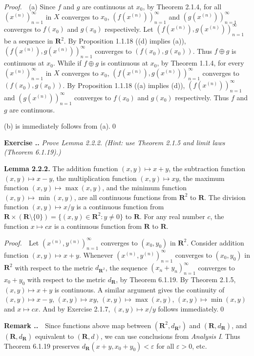 \documentclass{book}
\newcommand{\pff}{\vspace{.25em}\noindent\emph{Proof.}~~}
\newcommand{\remark}{\vspace{.5em}\noindent\textbf{Remark \textbf{\theExercise}}~~}
\newcommand{\titl}[1]{\noindent\textbf{#1}}
\newcounter{Exercise}[section]
\renewcommand{\theExercise}{\thesection.\arabic{Exercise}.}
\newcommand{\new}{\vspace{1.5em}\noindent\textbf{Exercise \stepcounter{Exercise}\textbf{\theExercise}} }
\begin{document}
\pff (a) Since $f$ and $g$ are continuous at $x_0$, by Theorem 2.1.4, for all $(x^{(n)})_{n=1}^{\infty}$ in $X$ converges to $x_0$, $(f(x^{(n)}))_{n=1}^{\infty}$ and $(g(x^{(n)}))_{n=1}^{\infty}$ converges to $f(x_0)$ and $g(x_0)$ respectively. Let $(f(x^{(n)}),g(x^{(n)}))_{n=1}^{\infty}$ be a sequence in $\mathbf{R}^2$. By Proposition 1.1.18 ((d) implies (a)), $(f(x^{(n)}),g(x^{(n)}))_{n=1}^{\infty}$ converges to $(f(x_0),g(x_0))$. Thus $f\oplus g$ is continuous at $x_0$. While if $f\oplus g$ is continuous at $x_0$, by Theorem 1.1.4, for every $(x^{(n)})_{n=1}^{\infty}$ in $X$ converges to $x_0$, $(f(x^{(n)}),g(x^{(n)}))_{n=1}^{\infty}$ converges to $(f(x_0),g(x_0))$. By Proposition 1.1.18 ((a) implies (d)), $(f(x^{(n)}))_{n=1}^{\infty}$ and $(g(x^{(n)}))_{n=1}^{\infty}$ converges to $f(x_0)$ and $g(x_0)$ respectively. Thus $f$ and $g$ are continuous.

(b) is immediately follows from (a).\qed

\new\emph{Prove Lemma 2.2.2. (Hint: use Theorem 2.1.5 and limit laws (Theorem 6.1.19).)}

\begin{framed}
\titl{Lemma 2.2.2.} The addition function $(x,y)\mapsto x+y$, the subtraction function $(x, y)\mapsto x-y$, the multiplication function $(x,y)\mapsto xy$, the maximum function $(x,y)\mapsto\max(x,y)$, and the minimum function $(x,y)\mapsto\min(x,y)$, are all continuous functions from $\mathbf{R}^2$ to $\mathbf{R}$. The division function $(x,y)\mapsto x/y$ is a continuous function from $\mathbf{R}\times(\mathbf{R}\setminus\{0\})=\{(x,y)\in\mathbf{R}^2:y\neq 0\}$ to $\mathbf{R}$. For any real number $c$, the function $x\mapsto cx$ is a continuous function from $\mathbf{R}$ to $\mathbf{R}$.
\end{framed}

\pff Let $(x^{(n)},y^{(n)})_{n=1}^{\infty}$ converges to $(x_0,y_0)$ in $\mathbf{R}^2$. Consider addition function $(x,y)\mapsto x+y$. Whenever $(x^{(n)},y^{(n)})_{n=1}^{\infty}$ converges to $(x_0,y_0)$ in $\mathbf{R}^2$ with respect to the metric $d_{\mathbf{R}^2}$, the sequence $(x_n+y_n)_{n=1}^{\infty}$ converges to $x_0+y_0$ with respect to the metric $d_{\mathbf{R}}$, by Theorem 6.1.19. By Theorem 2.1.5, $(x,y)\mapsto x+y$ is continuous. A similar argument gives the continuity of $(x, y)\mapsto x-y$, $(x,y)\mapsto xy$, $(x,y)\mapsto\max(x,y)$, $(x,y)\mapsto\min(x,y)$ and $x\mapsto cx$. And by Exercise 2.1.7, $(x,y)\mapsto x/y$ follows immediately.\qed

\remark Since functions above map between $(\mathbf{R}^2,d_{\mathbf{R}^2})$ and $(\mathbf{R},d_{\mathbf{R}})$, and $(\mathbf{R},d_{\mathbf{R}})$ equivalent to $(\mathbf{R},d)$, we can use conclusions from \emph{Analysis I}. Thus Theorem 6.1.19 preserves $d_{\mathbf{R}}(x+y,x_0+y_0)<\varepsilon$ for all $\varepsilon>0$, etc.
\end{document}
